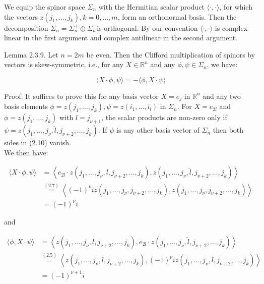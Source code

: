 \documentclass[10pt, letterpaper]{article}
\begin{document}
We equip the spinor space $\Sigma_{n}$ with the Hermitian scalar product $\langle\cdot, \cdot\rangle$, for which the vectors $z\left(j_{1}, \ldots, j_{k}\right), k=0, \ldots, m$, form an orthonormal basis. Then the decomposition $\Sigma_{n}=\Sigma_{n}^{+} \oplus \Sigma_{n}^{-}$is orthogonal. By our convention $\langle\cdot, \cdot\rangle$ is complex linear in the first argument and complex antilinear in the second argument.

Lemma 2.3.9. Let $n=2 m$ be even. Then the Clifford multiplication of spinors by vectors is skew-symmetric, i.e., for any $X \in \mathbb{R}^{n}$ and any $\phi, \psi \in \Sigma_{n}$, we have:

$$
\langle X \cdot \phi, \psi\rangle=-\langle\phi, X \cdot \psi\rangle
$$

Proof. It suffices to prove this for any basis vector $X=e_{j}$ in $\mathbb{R}^{n}$ and any two basis elements $\phi=z\left(j_{1}, \ldots, j_{k}\right), \psi=z\left(i_{1}, \ldots, i_{l}\right)$ in $\Sigma_{n}$. For $X=e_{2 l}$ and $\phi=z\left(j_{1}, \ldots, j_{k}\right)$ with $l=j_{\nu+1}$, the scalar products are non-zero only if $\psi=z\left(j_{1}, \ldots, j_{\nu}, \widehat{l}, j_{\nu+2}, \ldots, j_{k}\right)$. If $\psi$ is any other basis vector of $\Sigma_{n}$ then both sides in (2.10) vanish.\\
We then have:

$$
\begin{aligned}
\langle X \cdot \phi, \psi\rangle & =\left\langle e_{2 l} \cdot z\left(j_{1}, \ldots, j_{\nu}, l, j_{\nu+2}, \ldots, j_{k}\right), z\left(j_{1}, \ldots, j_{\nu}, \widehat{l}, j_{\nu+2}, \ldots, j_{k}\right)\right\rangle \\
& \stackrel{(2.7)}{=}\left\langle(-1)^{\nu} i z\left(j_{1}, \ldots, j_{\nu}, j_{\nu+2}, \ldots, j_{k}\right), z\left(j_{1}, \ldots, j_{\nu}, j_{\nu+2}, \ldots, j_{k}\right)\right\rangle \\
& =(-1)^{\nu} i
\end{aligned}
$$

and

$$
\begin{aligned}
\langle\phi, X \cdot \psi\rangle & =\left\langle z\left(j_{1}, \ldots, j_{\nu}, l, j_{\nu+2}, \ldots, j_{k}\right), e_{2 l} \cdot z\left(j_{1}, \ldots, j_{\nu}, \widehat{l}, j_{\nu+2}, \ldots, j_{k}\right)\right\rangle \\
& \stackrel{(2.5)}{=}\left\langle z\left(j_{1}, \ldots, j_{\nu}, l, j_{\nu+2}, \ldots, j_{k}\right),(-1)^{\nu} i z\left(j_{1}, \ldots, j_{\nu}, l, j_{\nu+2}, \ldots, j_{k}\right)\right\rangle \\
& =(-1)^{\nu+1} i
\end{aligned}
$$
\end{document}
